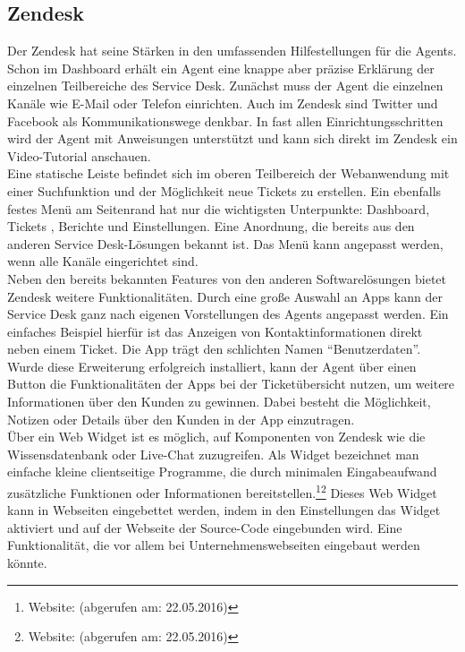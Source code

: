 \subsection{Zendesk}
\noindent 
Der Zendesk hat seine Stärken in den umfassenden Hilfestellungen für die Agents. Schon im Dashboard erhält ein Agent eine knappe aber präzise Erklärung der einzelnen Teilbereiche des Service Desk. Zunächst muss der Agent die einzelnen Kanäle wie E-Mail oder Telefon einrichten. Auch im Zendesk sind  Twitter und Facebook als Kommunikationswege denkbar. In fast allen Einrichtungsschritten wird der Agent mit Anweisungen unterstützt und kann sich direkt im Zendesk ein Video-Tutorial anschauen.\\
Eine statische Leiste befindet sich im oberen Teilbereich der Webanwendung mit einer Suchfunktion und der Möglichkeit neue Tickets zu erstellen. Ein ebenfalls festes Menü am Seitenrand hat nur die wichtigsten Unterpunkte: Dashboard, Tickets , Berichte und Einstellungen. Eine Anordnung, die bereits aus den anderen Service Desk-Lösungen bekannt ist. Das Menü kann angepasst werden, wenn alle Kanäle eingerichtet sind.\\
Neben den bereits bekannten Features von den anderen Softwarelösungen bietet Zendesk weitere Funktionalitäten. Durch eine große Auswahl an Apps kann der Service Desk ganz nach eigenen Vorstellungen des Agents angepasst werden. Ein einfaches Beispiel hierfür ist das Anzeigen von Kontaktinformationen direkt neben einem Ticket. Die App trägt den schlichten Namen \enquote{Benutzerdaten}. Wurde diese Erweiterung erfolgreich installiert, kann der Agent über einen Button die Funktionalitäten der Apps bei der Ticketübersicht nutzen,  um weitere Informationen über den Kunden zu gewinnen. Dabei besteht die Möglichkeit, Notizen oder Details über den Kunden in der App einzutragen.\\
Über ein Web Widget ist es möglich, auf Komponenten von Zendesk wie die Wissensdatenbank oder Live-Chat zuzugreifen. Als Widget bezeichnet man einfache kleine clientseitige Programme, die durch minimalen Eingabeaufwand zusätzliche Funktionen oder Informationen bereitstellen.\footnote{Website: \citeauthor{Widget1} (abgerufen am: 22.05.2016)}\footnote{Website: \citeauthor{Widget2} (abgerufen am: 22.05.2016)} Dieses Web Widget kann in Webseiten eingebettet werden, indem in den Einstellungen das Widget aktiviert und auf der Webseite der Source-Code eingebunden wird. Eine Funktionalität, die vor allem bei Unternehmenswebseiten  eingebaut werden könnte.\\
